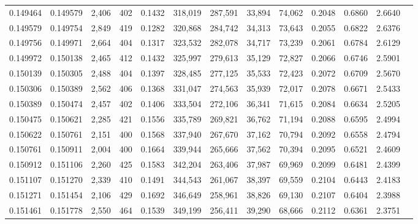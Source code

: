 \begin{tabular}{rrrrrrrrrrrrr}
0.149464 & 0.149579 & 2,406 & 402 &                                     0.1432 & 318,019 & 287,591 &  33,894 &  74,062 & 0.2048 & 0.6860 & 2.6640 \\
0.149579 & 0.149754 & 2,849 & 419 &                                     0.1282 & 320,868 & 284,742 &  34,313 &  73,643 & 0.2055 & 0.6822 & 2.6376 \\
0.149756 & 0.149971 & 2,664 & 404 &                                     0.1317 & 323,532 & 282,078 &  34,717 &  73,239 & 0.2061 & 0.6784 & 2.6129 \\
0.149972 & 0.150138 & 2,465 & 412 &                                     0.1432 & 325,997 & 279,613 &  35,129 &  72,827 & 0.2066 & 0.6746 & 2.5901 \\
0.150139 & 0.150305 & 2,488 & 404 &                                     0.1397 & 328,485 & 277,125 &  35,533 &  72,423 & 0.2072 & 0.6709 & 2.5670 \\
0.150306 & 0.150389 & 2,562 & 406 &                                     0.1368 & 331,047 & 274,563 &  35,939 &  72,017 & 0.2078 & 0.6671 & 2.5433 \\
0.150389 & 0.150474 & 2,457 & 402 &                                     0.1406 & 333,504 & 272,106 &  36,341 &  71,615 & 0.2084 & 0.6634 & 2.5205 \\
0.150475 & 0.150621 & 2,285 & 421 &                                     0.1556 & 335,789 & 269,821 &  36,762 &  71,194 & 0.2088 & 0.6595 & 2.4994 \\
0.150622 & 0.150761 & 2,151 & 400 &                                     0.1568 & 337,940 & 267,670 &  37,162 &  70,794 & 0.2092 & 0.6558 & 2.4794 \\
0.150761 & 0.150911 & 2,004 & 400 &                                     0.1664 & 339,944 & 265,666 &  37,562 &  70,394 & 0.2095 & 0.6521 & 2.4609 \\
0.150912 & 0.151106 & 2,260 & 425 &                                     0.1583 & 342,204 & 263,406 &  37,987 &  69,969 & 0.2099 & 0.6481 & 2.4399 \\
0.151107 & 0.151270 & 2,339 & 410 &                                     0.1491 & 344,543 & 261,067 &  38,397 &  69,559 & 0.2104 & 0.6443 & 2.4183 \\
0.151271 & 0.151454 & 2,106 & 429 &                                     0.1692 & 346,649 & 258,961 &  38,826 &  69,130 & 0.2107 & 0.6404 & 2.3988 \\
0.151461 & 0.151778 & 2,550 & 464 &                                     0.1539 & 349,199 & 256,411 &  39,290 &  68,666 & 0.2112 & 0.6361 & 2.3751 \\

\end{tabular}
